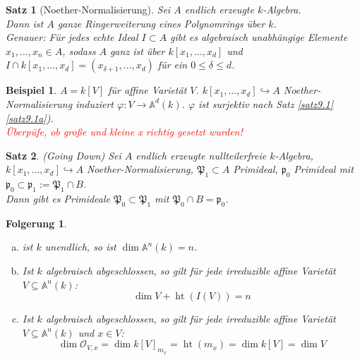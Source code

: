 \documentclass[a4paper,12pt]{report}
\theoremstyle{break}
\newtheorem{UnterSatz}{Satz}[Satz]
\newtheorem{Folg}[Def]{Folgerung}
\theoremstyle{nonumberbreak}
\newtheorem{nnBsp}{Beispiel}
\theoremstyle{nonumberplain}
\newcommand{\quot}[1]{\textrm{\glqq}{#1}\textrm{\grqq}}
\DeclareMathOperator{\Ht}{ht}
\newcommand{\A}{\mathbb{A}}
\newcommand{\calO}{\mathcal{O}}
\begin{document}
\begin{UnterSatz}[\quot{Noether-Normalisierung}]
Sei $A$ endlich erzeugte $k$-Algebra.\\
Dann ist $A$ ganze Ringerweiterung eines Polynomrings \"uber $k$.\\
\emph{Genauer:} F\"ur jedes echte Ideal $I\subset A$ gibt es algebraisch unabh\"angige Elemente $x_1,\ldots ,x_n\in A$, sodass $A$ ganz ist \"uber $k[x_1,\ldots ,x_d]$ und $I\cap k[x_1,\ldots ,x_d]=(x_{\delta+1},\ldots ,x_d)$ f\"ur ein $0\le\delta\le d$.
\end{UnterSatz}

\begin{nnBsp}
$A=k[V]$ f\"ur affine Variet\"at $V$. $k[x_1,\ldots ,x_d] \hookrightarrow A$ Noether-Normalisierung induziert $\varphi:V\to\A^d(k)$. $\varphi$ ist surjektiv nach Satz \ref{satz9.1} \ref{satz9.1a}).\\
\textcolor{red}{\"Uberp\"ufe, ob gro\ss e und kleine x richtig gesetzt wurden!}
\end{nnBsp}

\begin{UnterSatz}
(\quot{Going Down}) Sei $A$ endlich erzeugte nullteilerfreie $k$-Algebra, $k[x_1,\ldots ,x_d]\hookrightarrow A$ Noether-Normalisierung, $\mathfrak P_1\subset A$ Primideal, $\mathfrak p_0$ Primideal mit $\mathfrak p_0 \subset \mathfrak p_1 := \mathfrak P_1\cap B$.\\
Dann gibt es Primideale $\mathfrak P_0\subset \mathfrak P_1$ mit $\mathfrak P_0\cap B=\mathfrak p_0$.
\begin{center}\end{center}
\end{UnterSatz}

\begin{Folg}\label{folg18.5}\begin{enumerate}[a)]
\item
	ist $k$ unendlich, so ist $\dim\A^n(k)=n$.
\item\label{folg18.5b}
	Ist $k$ algebraisch abgeschlossen, so gilt f\"ur jede irreduzible affine Variet\"at $V\subseteq\A^n(k)$:
		\[\dim V + \Ht(I(V))=n\]
\item\label{folg18.5c}
	Ist $k$ algebraisch abgeschlossen, so gilt f\"ur jede irreduzible affine Variet\"at $V\subseteq\A^n(k)$ und $x\in V$:
		\[\dim\calO_{V,x}=\dim k[V]_{m_x}=\Ht(m_x)=\dim k[V]=\dim V\]
\end{enumerate}\end{Folg}
\end{document}
